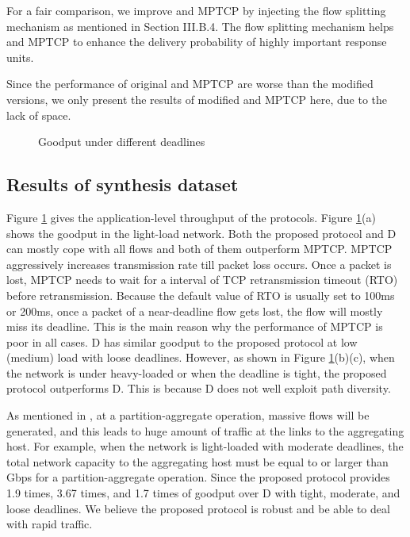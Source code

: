 \documentclass[conference]{IEEEtran}
\begin{document}
For a fair comparison, we improve  and MPTCP by injecting the flow splitting mechanism as mentioned in Section III.B.4. The flow splitting mechanism helps  and MPTCP to enhance the delivery probability of highly important response units.

Since the performance of original  and MPTCP are worse than the modified versions, we only present the results of modified  and MPTCP here, due to the lack of space.

\begin{figure}
  \centering
  \caption[what]{Goodput under different deadlines}\label{fig:gp}
\end{figure}

\subsection{Results of synthesis dataset}

Figure \ref{fig:gp} gives the application-level throughput of the protocols. Figure \ref{fig:gp}(a) shows the goodput in the light-load network. Both the proposed protocol and D can mostly cope with all flows and both of them outperform MPTCP. MPTCP aggressively increases transmission rate till packet loss occurs. Once a packet is lost, MPTCP needs to wait for a interval of TCP retransmission timeout (RTO) before retransmission. Because the default value of RTO is usually set to 100ms or 200ms, once a packet of a near-deadline flow gets lost, the flow will mostly miss its deadline. This is the main reason why the performance of MPTCP is poor in all cases. D has similar goodput to the proposed protocol at low (medium) load with loose deadlines. However, as shown in Figure \ref{fig:gp}(b)(c), when the network is under heavy-loaded or when the deadline is tight, the proposed protocol outperforms D. This is because D does not well exploit path diversity.

As mentioned in \cite{incast2}, at a partition-aggregate operation, massive flows will be generated, and this leads to huge amount of traffic at the links to the aggregating host. For example, when the network is light-loaded with moderate deadlines, the total network capacity to the aggregating host must be equal to or larger than Gbps for a partition-aggregate operation. Since the proposed protocol provides 1.9 times, 3.67 times, and 1.7 times of goodput over D with tight, moderate, and loose deadlines. We believe the proposed protocol is robust and be able to deal with rapid traffic.
\end{document}
